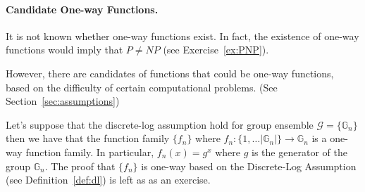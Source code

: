 \documentclass[12pt]{tufte-book}
\begin{document}
\paragraph{Candidate One-way Functions.}
It is not known whether one-way functions exist. In fact, the existence of one-way functions would imply that $P \neq NP$ (see Exercise~\ref{ex:PNP}). 

However, there are candidates of functions that could be one-way functions, based on the difficulty of certain computational problems. (See Section~\ref{sec:assumptions})%
%


%
%
Let's suppose that the discrete-log assumption hold for group ensemble $\mathcal{G} = \{\mathbb{G}_n\}$ then we have that the function family $\{f_n\}$ where $f_n: \{1,\ldots |\mathbb{G}_n|\}\rightarrow \mathbb{G}_n$ is a one-way function family. In particular, $f_n(x) = g^x$ where $g$ is the generator of the group $\mathbb{G}_n$. The proof that $\{f_n\}$ is one-way based on the Discrete-Log Assumption (see Definition~\ref{def:dl}) is left as as an exercise. 
\end{document}
